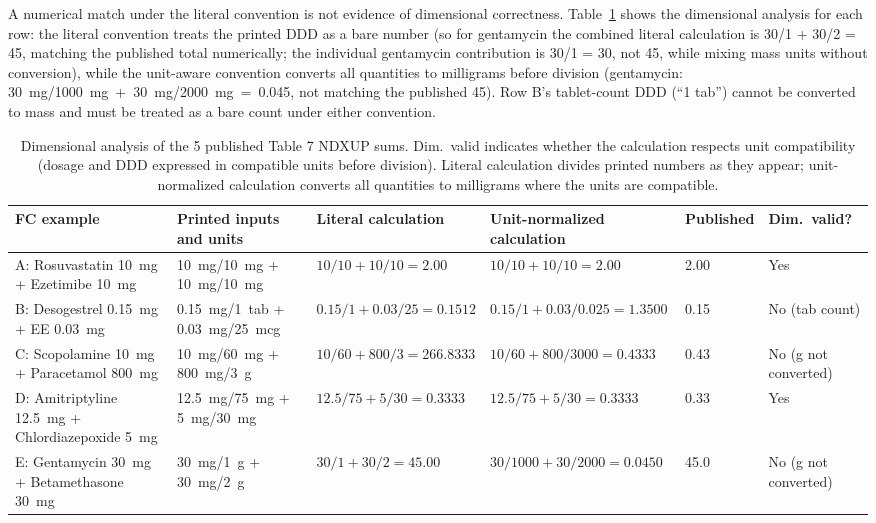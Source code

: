 \documentclass[12pt]{article}
\begin{document}
A numerical match under the literal convention is not evidence of dimensional correctness. Table~\ref{tab:table7-dim} shows the dimensional analysis for each row: the literal convention treats the printed DDD as a bare number (so for gentamycin the combined literal calculation is 30/1 + 30/2 = 45, matching the published total numerically; the individual gentamycin contribution is 30/1 = 30, not 45, while mixing mass units without conversion), while the unit-aware convention converts all quantities to milligrams before division (gentamycin: 30~mg/1000~mg~+~30~mg/2000~mg~=~0.045, not matching the published 45). Row B's tablet-count DDD (``1 tab'') cannot be converted to mass and must be treated as a bare count under either convention.

\begin{table}[htbp]
\centering\small
\caption{Dimensional analysis of the 5 published Table 7 NDXUP sums. Dim.\ valid indicates whether the calculation respects unit compatibility (dosage and DDD expressed in compatible units before division). Literal calculation divides printed numbers as they appear; unit-normalized calculation converts all quantities to milligrams where the units are compatible.}
\label{tab:table7-dim}
\begin{tabular}{@{}p{2.2cm}p{2.6cm}p{3.0cm}p{3.0cm}p{1.5cm}p{1.8cm}@{}}
\toprule
FC example & Printed inputs and units & Literal calculation & Unit-normalized calculation & Published & Dim.\ valid? \\
\midrule
A: Rosuvastatin 10~mg + Ezetimibe 10~mg & 10~mg/10~mg + 10~mg/10~mg & $10/10 + 10/10 = 2.00$ & $10/10 + 10/10 = 2.00$ & 2.00 & Yes \\
B: Desogestrel 0.15~mg + EE 0.03~mg & 0.15~mg/1~tab + 0.03~mg/25~mcg & $0.15/1 + 0.03/25 = 0.1512$ & $0.15/1 + 0.03/0.025 = 1.3500$ & 0.15 & No (tab count) \\
C: Scopolamine 10~mg + Paracetamol 800~mg & 10~mg/60~mg + 800~mg/3~g & $10/60 + 800/3 = 266.8333$ & $10/60 + 800/3000 = 0.4333$ & 0.43 & No (g not converted) \\
D: Amitriptyline 12.5~mg + Chlordiazepoxide 5~mg & 12.5~mg/75~mg + 5~mg/30~mg & $12.5/75 + 5/30 = 0.3333$ & $12.5/75 + 5/30 = 0.3333$ & 0.33 & Yes \\
E: Gentamycin 30~mg + Betamethasone 30~mg & 30~mg/1~g + 30~mg/2~g & $30/1 + 30/2 = 45.00$ & $30/1000 + 30/2000 = 0.0450$ & 45.0 & No (g not converted) \\
\bottomrule
\end{tabular}
\end{table}
\end{document}
